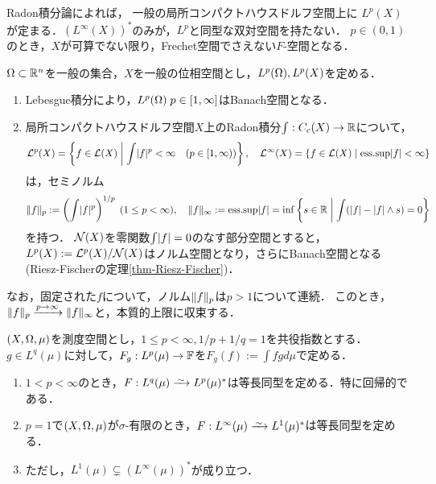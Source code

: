 \documentclass[uplatex,dvipdfmx]{jsreport}
\begin{document}
\begin{tcolorbox}[colframe=ForestGreen, colback=ForestGreen!10!white,breakable,colbacktitle=ForestGreen!40!white,coltitle=black,fonttitle=\bfseries\sffamily,
title=]
    Radon積分論によれば，
    一般の局所コンパクトハウスドルフ空間上に
    $L^p(X)$が定まる．$(L^\infty(X))^*$のみが，$L^p$と同型な双対空間を持たない．
    $p\in(0,1)$のとき，$X$が可算でない限り，Frechet空間でさえない$F$-空間となる．
\end{tcolorbox}

\begin{example}[測度空間上の体値関数の同値類]\label{exp-Banach-space-of-Radon-integrable-functions}
    $\Omega\subset\mathbb{R}^n$を一般の集合，$X$を一般の位相空間とし，$L^p(\Omega),L^p(X)$を定める．
    \begin{enumerate}
        \item Lebesgue積分により，$L^p(\Omega)\;p\in[1,\infty]$はBanach空間となる．
        \item 局所コンパクトハウスドルフ空間$X$上のRadon積分$\int:C_c(X)\to\mathbb{R}$について，
        \begin{align*}
            \mathcal{L}^p(X)=\left\{f\in\mathcal{L}(X)\;\middle|\;\int\lvert f\rvert^p<\infty\quad(p\in[1,\infty))\right\},\quad\mathcal{L}^\infty(X)=\left\{f\in\mathcal{L}(X)\;\middle|\;\mathrm{ess.sup}\lvert f\rvert<\infty\right\}
        \end{align*}
        は，セミノルム
        \[\|f\|_p:=\left(\int\lvert f\rvert^p\right)^{1/p}\;(1\le p<\infty),\quad\|f\|_\infty:=\mathrm{ess.sup}\lvert f\rvert=\inf\left\{s\in\mathbb{R}\;\middle|\;\int(\lvert f\rvert-\lvert f\rvert\land s)=0\right\}\]
        を持つ．
        $\mathcal{N}(X)$を零関数$\int\lvert f\rvert=0$のなす部分空間とすると，$L^p(X):=\mathcal{L}^p(X)/\mathcal{N}(X)$はノルム空間となり，さらにBanach空間となる(Riesz-Fischerの定理\ref{thm-Riesz-Fischer})．
    \end{enumerate}
    なお，固定された$f$について，ノルム$\|f\|_p$は$p>1$について連続．
    このとき，$\|f\|_p\xrightarrow{p\to\infty}\|f\|_\infty$と，本質的上限に収束する．
\end{example}
    
\begin{theorem}[$L^p$空間の描像]\label{thm-Lp-of-dual-spaces}
    $(X,\Omega,\mu)$を測度空間とし，$1\le p<\infty,1/p+1/q=1$を共役指数とする．
    $g\in L^q(\mu)$に対して，$F_g:L^p(\mu)\to\mathbb{F}$を$F_g(f):=\int fgd\mu$で定める．
    \begin{enumerate}
        \item $1<p<\infty$のとき，$F:L^q(\mu)\iso L^p(\mu)^*$は等長同型を定める．特に回帰的である．
        \item $p=1$で$(X,\Omega,\mu)$が$\sigma$-有限のとき，$F:L^\infty(\mu)\iso L^1(\mu)^*$は等長同型を定める．
        \item ただし，$L^1(\mu)\subsetneq (L^\infty(\mu))^*$が成り立つ．
    \end{enumerate}
\end{theorem}
\end{document}
